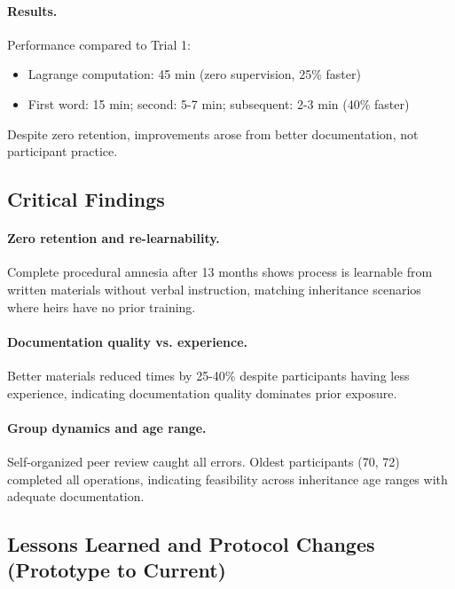 \documentclass[11pt]{article}
\begin{document}
\paragraph{Results.} Performance compared to Trial 1:
\begin{itemize}[noitemsep]
    \item Lagrange computation: 45 min (zero supervision, 25\% faster)
    \item First word: 15 min; second: 5-7 min; subsequent: 2-3 min (40\% faster)
\end{itemize}

Despite zero retention, improvements arose from better documentation, not participant practice.

\subsection{Critical Findings}

\paragraph{Zero retention and re-learnability.} Complete procedural amnesia after 13 months shows process is learnable from written materials without verbal instruction, matching inheritance scenarios where heirs have no prior training.

\paragraph{Documentation quality vs. experience.} Better materials reduced times by 25-40\% despite participants having less experience, indicating documentation quality dominates prior exposure.

\paragraph{Group dynamics and age range.} Self-organized peer review caught all errors. Oldest participants (70, 72) completed all operations, indicating feasibility across inheritance age ranges with adequate documentation.

\subsection{Lessons Learned and Protocol Changes (Prototype to Current)}
\end{document}
